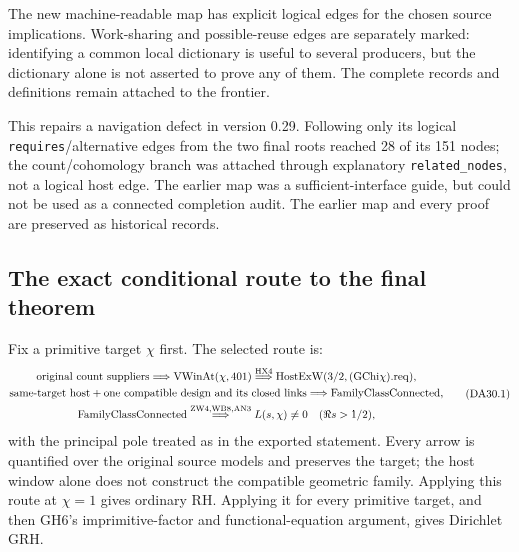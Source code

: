 The new machine-readable map has explicit logical edges for the chosen
source implications.  Work-sharing and possible-reuse edges are separately
marked: identifying a common local dictionary is useful to several
producers, but the dictionary alone is not asserted to prove any of them.
The complete records and definitions remain attached to the frontier.

This repairs a navigation defect in version 0.29.  Following only its
logical \texttt{requires}/alternative edges from the two final roots
reached 28 of its 151 nodes; the count/cohomology branch was attached
through explanatory \texttt{related\_nodes}, not a logical host edge.
The earlier map was a sufficient-interface guide, but could not be used
as a connected completion audit.  The earlier map and every proof are
preserved as historical records.

\subsection{The exact conditional route to the final theorem}

Fix a primitive target $\chi$ first.  The selected route is:
\[
 \begin{gathered}
 \text{original count suppliers}
       \Longrightarrow \mathrm{VWinAt}(\chi,401)
       \mathrel{\mathop{\Longrightarrow}^{\rm HX4}}
                 \mathrm{HostExW}(3/2,(\mathrm{GChi}\chi).\mathrm{req}),\\
 \text{same-target host}+
       \text{one compatible design and its closed links}
       \Longrightarrow \mathrm{FamilyClassConnected},\\
 \mathrm{FamilyClassConnected}
       \mathrel{\mathop{\Longrightarrow}^{\rm ZW4,WB8,AN3}}
                L(s,\chi)\ne0\quad(\Re s>1/2),
 \end{gathered}                                                    \tag{DA30.1}
\]
with the principal pole treated as in the exported statement.
Every arrow is quantified over the original source models and preserves
the target; the host window alone does not construct the compatible
geometric family.  Applying this route at $\chi=1$ gives ordinary RH.
Applying it for every primitive target, and then GH6's imprimitive-factor
and functional-equation argument, gives Dirichlet GRH.

